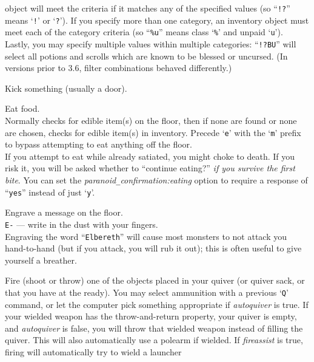 object will meet the criteria if it matches any of the specified
values (so ``{\tt !?}'' means `{\tt !}' or `{\tt ?}').
If you specify more than one category, an inventory object must meet
each of the category criteria (so ``{\tt \%u}'' means class `{\tt \%}' and
unpaid `{\tt u}').
Lastly, you may specify multiple values within multiple categories:
``{\tt !?BU}'' will select all potions and scrolls which are known to be
blessed or uncursed.
(In versions prior to 3.6, filter combinations behaved differently.)
\item[\tb{\^{}D}]
Kick something (usually a door).
\item[\tb{e}]
Eat food.\\
Normally checks for edible item(s) on the floor, then if none are found
or none are chosen, checks for edible item(s) in inventory.
Precede `{\tt e}' with the `{\tt m}' prefix to bypass attempting to eat
anything off the floor.\\
If you attempt to eat while already satiated, you might choke to death.
If you risk it, you will be asked whether
to ``continue eating?'' {\it if you survive the first bite\/}.
You can set the
{\it paranoid\verb+_+confirmation:eating\/}
option to require a response of ``{\tt yes}'' instead of just `{\tt y}'.
\item[\tb{E}]
Engrave a message on the floor.\\
{\tt E-} --- write in the dust with your fingers.\\
Engraving the word ``{\tt Elbereth}'' will cause most monsters to not attack
you hand-to-hand (but if you attack, you will rub it out); this is
often useful to give yourself a breather.
\item[\tb{f}]
Fire (shoot or throw) one of the objects placed in your quiver (or
quiver sack, or that you have at the ready).
You may select ammunition with a previous `{\tt Q}' command, or let the
computer pick something appropriate if {\it autoquiver\/} is true.
If your wielded weapon has the throw-and-return property, your quiver
is empty, and {\it autoquiver\/}
is false, you will throw that wielded weapon instead of filling the quiver.
This will also automatically use a polearm if wielded.
If {\it fireassist\/} is true, firing will automatically try to wield a launcher
